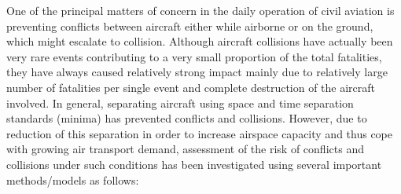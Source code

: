 \documentclass[a4paper, 10pt]{article}
\begin{document}
One of the principal matters of concern in the daily
operation of civil aviation is preventing conflicts between
aircraft either while airborne or on the ground, which might
escalate to collision. Although aircraft collisions have actually
been very rare events contributing to a very small proportion of
the total fatalities, they have always caused relatively strong
impact mainly due to relatively large number of fatalities per
single event and complete destruction of the aircraft involved.
In general, separating aircraft using space and time separation
standards (minima) has prevented conflicts and collisions.
However, due to reduction of this separation in order to
increase airspace capacity and thus cope with growing air
transport demand, assessment of the risk of conflicts and
collisions under such conditions has been investigated using
several important methods/models as follows:
\end{document}
